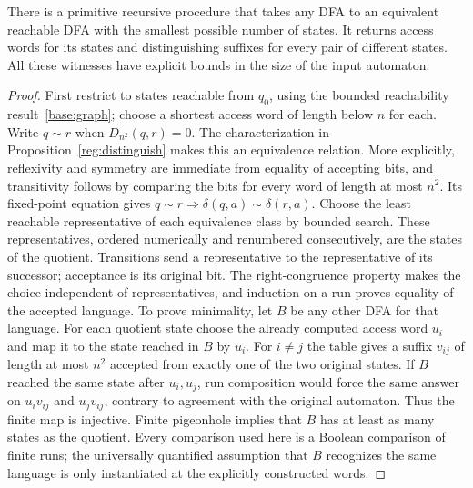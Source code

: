 \begin{theorem}\label{reg:minimize}
There is a primitive recursive procedure that takes any DFA to an
equivalent reachable DFA with the smallest possible number of states.
It returns access words for its states and distinguishing suffixes for
every pair of different states.  All these witnesses have explicit
bounds in the size of the input automaton.
\end{theorem}
\begin{proof}
First restrict to states reachable from $q_0$, using
the bounded reachability result~\ref{base:graph}; choose a shortest access word of length below $n$
for each.  Write $q\sim r$ when $D_{n^2}(q,r)=0$.
The characterization in Proposition~\ref{reg:distinguish} makes this
an equivalence relation.  More explicitly, reflexivity and symmetry are
immediate from equality of accepting bits, and transitivity follows by
comparing the bits for every word of length at most $n^2$.  Its fixed-point
equation gives $q\sim r\Rightarrow\delta(q,a)\sim\delta(r,a)$.
Choose the least reachable representative of each equivalence class by
bounded search.  These representatives, ordered numerically and
renumbered consecutively, are the states of the quotient.  Transitions
send a representative to the representative of its successor; acceptance
is its original bit.  The right-congruence property makes the choice
independent of representatives, and induction on a run proves equality
of the accepted language.
To prove minimality, let $B$ be any other DFA for that language.  For
each quotient state choose the already computed access word $u_i$ and
map it to the state reached in $B$ by $u_i$.  For $i\ne j$ the table gives
a suffix $v_{ij}$ of length at most $n^2$ accepted from exactly one of
the two original states.  If $B$ reached the same state after $u_i,u_j$,
run composition would force the same answer on $u_iv_{ij}$ and
$u_jv_{ij}$, contrary to agreement with the original automaton.  Thus
the finite map is injective.  Finite pigeonhole implies that $B$ has at
least as many states as the quotient.  Every comparison used here is a
Boolean comparison of finite runs; the universally quantified assumption
that $B$ recognizes the same language is only instantiated at the
explicitly constructed words.
\end{proof}

